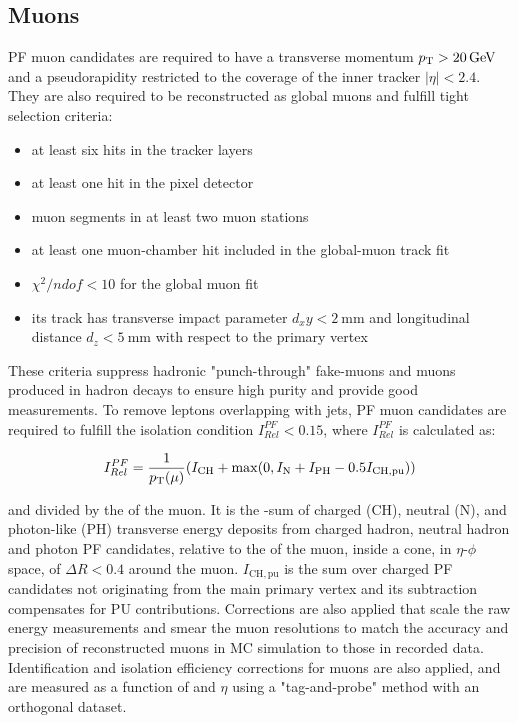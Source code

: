 \subsection{Muons}
PF muon candidates are required to have a transverse momentum $\pT > \SI{20}{\GeV}$ and a pseudorapidity restricted to the coverage of the inner tracker $\vert \eta \vert < 2.4$.
They are also required to be reconstructed as global muons and fulfill tight selection criteria: 
\begin{itemize}
    \item at least six hits in the tracker layers
    \item at least one hit in the pixel detector
    \item muon segments in at least two muon stations
    \item at least one muon-chamber hit included in the global-muon track fit
    \item $\chi^2/ndof < 10$ for the global muon fit
    \item its track has transverse impact parameter $d_xy< \SI{2}{\mm}$ and longitudinal distance $d_z< \SI{5}{\mm}$ with respect to the primary vertex
\end{itemize}
These criteria suppress hadronic "punch-through" fake-muons and muons produced in hadron decays to ensure high purity and provide good \pT measurements.
To remove leptons overlapping with jets, PF muon candidates are required to fulfill the isolation condition $I^{PF}_{Rel}< 0.15$, where $I^{PF}_{Rel}$ is calculated as: 
\begin{linenomath*}
\begin{align}
I^{PF}_{Rel} = \frac{1}{p_{\mathrm{T}}(\mu)}(I_\mathrm{CH} + \max(0, I_\mathrm{N} + I_\mathrm{PH} - 0.5 I_\mathrm{CH,pu}))
\end{align}
\end{linenomath*}
and divided by the \pT of the muon.
It is the \pT-sum of charged (CH), neutral (N), and photon-like (PH) transverse energy deposits from charged hadron, neutral hadron and photon PF candidates, relative to the \pT of the muon, inside a cone, in $\eta$-$\phi$ space, of $\Delta R < 0.4$ around the muon.
$I_\mathrm{CH,pu}$ is the sum over charged PF candidates not originating from the main primary vertex and its subtraction compensates for PU contributions. 
Corrections are also applied that scale the raw energy measurements and smear the muon resolutions to match the accuracy and precision of reconstructed muons in MC simulation to those in recorded data.
Identification and isolation efficiency corrections for muons are also applied, and are measured as a function of \pT and $\eta$ using a "tag-and-probe" method with an orthogonal dataset.

